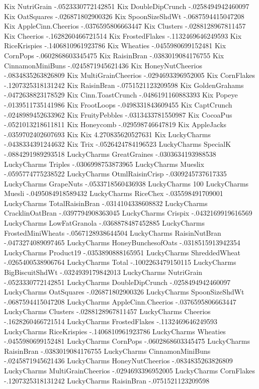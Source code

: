 Kix	NutriGrain	-.0523330772142851
Kix	DoubleDipCrunch	-.0258494942460097
Kix	OatSquares	-.026871802900326
Kix	SpoonSizeShdWt	-.0687594415047208
Kix	AppleCinn.Cheerios	-.0376595806663447
Kix	Clusters	-.0288128967811457
Kix	Cheerios	-.1628260466721514
Kix	FrostedFlakes	-.1132469646249593
Kix	RiceKrispies	-.1406810961923786
Kix	Wheaties	-.0455980699152481
Kix	CornPops	-.0602868603345475
Kix	RaisinBran	-.0383019084176755
Kix	CinnamonMiniBuns	-.0245871945621436
Kix	HoneyNutCheerios	-.0834835263826809
Kix	MultiGrainCheerios	-.0294693396952005
Kix	CornFlakes	-.1207325318131242
Kix	RaisinBran	-.0751521123209598
Kix	GoldenGrahams	-.0472638823178529
Kix	Cinn.ToastCrunch	-.0486191160883393
Kix	Popeye	-.0139511735141986
Kix	FrootLoops	-.0498331843609455
Kix	CaptCrunch	-.0248989452633962
Kix	FruityPebbles	-.0313433781550987
Kix	CocoaPus	-.0521013218611811
Kix	Honeycomb	-.029598746647819
Kix	AppleJacks	-.0359702402607693
Kix	Kix	4.270835620527631
Kix	LuckyCharms	-.0438334391244632
Kix	Trix	-.0526424784196523
LuckyCharms	SpecialK	-.0884291989293518
LuckyCharms	GreatGraines	-.0303634193988538
LuckyCharms	Triples	-.0306998753873965
LuckyCharms	Mueslix	-.0595774775238522
LuckyCharms	OtmlRaisinCrisp	-.0309245737617335
LuckyCharms	GrapeNuts	-.0533718560436938
LuckyCharms	100%
LuckyCharms	Muesli	-.0495084918589432
LuckyCharms	RiceChex	-.035598491709001
LuckyCharms	TotalRaisinBran	-.0314104338608832
LuckyCharms	CracklinOatBran	-.0397794908363045
LuckyCharms	Crispix	-.0432169919616569
LuckyCharms	LowFatGranola	-.0368878487452885
LuckyCharms	FrostedMiniWheats	-.0567128938644504
LuckyCharms	RaisinNutBran	-.0473274089097465
LuckyCharms	HoneyBunchesofOats	-.0318515913942354
LuckyCharms	Product19	-.0353890888165951
LuckyCharms	ShreddedWheat	-.0265400538906764
LuckyCharms	Total	-.1002263479150115
LuckyCharms	BigBiscuitShdWt	-.0324939179842013
LuckyCharms	NutriGrain	-.0523330772142851
LuckyCharms	DoubleDipCrunch	-.0258494942460097
LuckyCharms	OatSquares	-.026871802900326
LuckyCharms	SpoonSizeShdWt	-.0687594415047208
LuckyCharms	AppleCinn.Cheerios	-.0376595806663447
LuckyCharms	Clusters	-.0288128967811457
LuckyCharms	Cheerios	-.1628260466721514
LuckyCharms	FrostedFlakes	-.1132469646249593
LuckyCharms	RiceKrispies	-.1406810961923786
LuckyCharms	Wheaties	-.0455980699152481
LuckyCharms	CornPops	-.0602868603345475
LuckyCharms	RaisinBran	-.0383019084176755
LuckyCharms	CinnamonMiniBuns	-.0245871945621436
LuckyCharms	HoneyNutCheerios	-.0834835263826809
LuckyCharms	MultiGrainCheerios	-.0294693396952005
LuckyCharms	CornFlakes	-.1207325318131242
LuckyCharms	RaisinBran	-.0751521123209598

